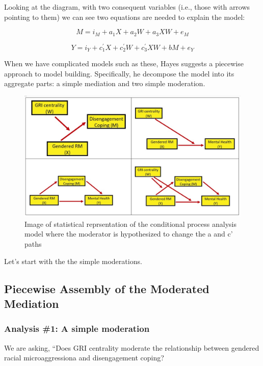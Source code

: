 \documentclass[
]{book}
\begin{document}
Looking at the diagram, with two consequent variables (i.e., those with arrows pointing to them) we can see two equations are needed to explain the model:

\[M = i_{M}+a_{1}X + a_{2}W + a_{3}XW + e_{M}\]

\[Y = i_{Y}+c_{1}^{'}X+ c_{2}^{'}W+c_{3}^{'}XW+ bM+e_{Y}\]

When we have complicated models such as these, Hayes \citeyearpar{hayes_introduction_2018} suggests a piecewise approach to model building. Specifically, he decompose the model into its aggregate parts: a simple mediation and two simple moderation.

\begin{figure}
\centering
\includegraphics{images/ModMed/PiecewiseAssembly.jpg}
\caption{Image of statistical reprsentation of the conditional process analysis model where the moderator is hypothesized to change the a and c' paths}
\end{figure}

Let's start with the the simple moderations.

\hypertarget{piecewise-assembly-of-the-moderated-mediation}{%
\subsection{Piecewise Assembly of the Moderated Mediation}\label{piecewise-assembly-of-the-moderated-mediation}}

\hypertarget{analysis-1-a-simple-moderation}{%
\subsubsection{Analysis \#1: A simple moderation}\label{analysis-1-a-simple-moderation}}

We are asking, ``Does GRI centrality moderate the relationship between gendered racial microaggressiona and disengagement coping?
\end{document}
